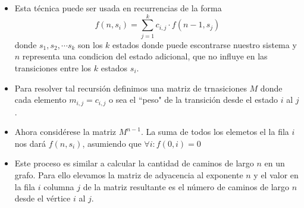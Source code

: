 \begin{itemize}
    \item{
		Esta t\'ecnica puede ser usada en recurrencias de la forma
		$$ f(n, s_i) = \sum_{j=1}^k {c_{i, j} \cdot f(n-1, s_j)}$$ 
		donde $s_1, s_2, \cdots s_k $ son los $k$ estados donde puede escontrarse nuestro sistema
		y $n$ representa una condicion del estado adicional, que no influye en las transiciones entre 
		los $k$ estados $s_i$. 
    }
    \item{
		Para resolver tal recursi\'on definimos una matriz de trnasiciones $M$ donde cada elemento 
		$m_{i, j} = c_{i, j}$ o sea el ``peso" de la transici\'on desde el estado $i$ al $j$. 
    }
    \item{
		Ahora consid\'erese la matriz $M^{n-1}$. La suma de todos los elemetos el la fila $i$ nos dar\'a 
		$f(n, s_i)$, asumiendo que $ \forall i : f(0, i) = 0 $  
	}
	\item{
		Este proceso es similar a calcular la cantidad de caminos de largo $n$ en un grafo. Para ello elevamos la 
		matriz de adyacencia al exponente $n$ y el valor en la fila $i$ columna $j$ de la matriz resultante es el 
		n\'umero de caminos de largo $n$ desde el v\'ertice $i$ al $j$. 
    }
\end{itemize}
